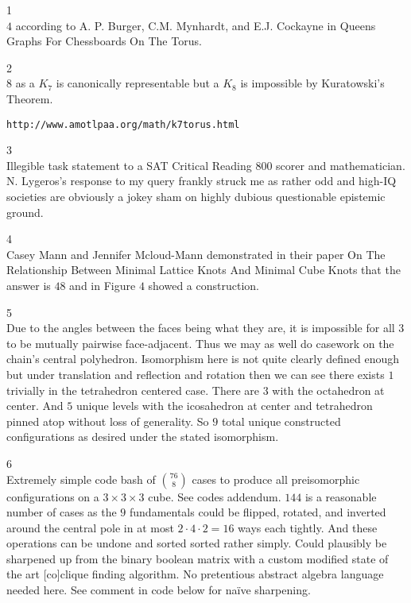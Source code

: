 1 \\
$\boxed{4}$ according to A. P. Burger, C.M. Mynhardt, and E.J. Cockayne in Queens Graphs For Chessboards On The Torus.

2 \\
$\boxed{8}$ as a $K_7$ is canonically representable but a $K_8$ is impossible by Kuratowski's Theorem.

\begin{verbatim}
http://www.amotlpaa.org/math/k7torus.html
\end{verbatim}

3 \\
Illegible task statement to a SAT Critical Reading $800$ scorer and mathematician. N. Lygeros's response to my query frankly struck me as rather odd and high-IQ societies are obviously a jokey sham on highly dubious questionable epistemic ground.

4 \\
Casey Mann and Jennifer Mcloud-Mann demonstrated in their paper On The Relationship Between Minimal Lattice Knots And Minimal Cube Knots that the answer is $\boxed{48}$ and in Figure $4$ showed a construction.

5 \\
Due to the angles between the faces being what they are, it is impossible for all $3$ to be mutually pairwise face-adjacent. Thus we may as well do casework on the chain's central polyhedron. Isomorphism here is not quite clearly defined enough but under translation and reflection and rotation then we can see there exists $1$ trivially in the tetrahedron centered case. There are $3$ with the octahedron at center. And $5$ unique levels with the icosahedron at center and tetrahedron pinned atop without loss of generality. So $\boxed{9}$ total unique constructed configurations as desired under the stated isomorphism.

6 \\
Extremely simple code bash of $\binom{76}{8}$ cases to produce all preisomorphic configurations on a $3 \times 3 \times 3$ cube. See codes addendum. $144$ is a reasonable number of cases as the $9$ fundamentals could be flipped, rotated, and inverted around the central pole in at most $2 \cdot 4 \cdot 2 = 16$ ways each tightly. And these operations can be undone and sorted sorted rather simply. Could plausibly be sharpened up from the binary boolean matrix with a custom modified state of the art [co]clique finding algorithm. No pretentious abstract algebra language needed here. See comment in code below for naïve sharpening.

